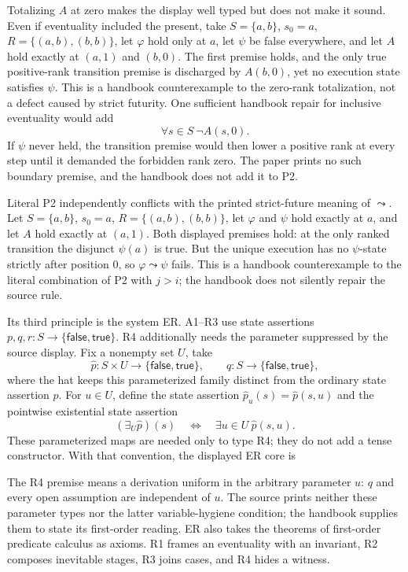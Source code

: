 Totalizing \(A\) at zero makes the display well typed but does not make it
sound.  Even if eventuality included the present, take
\(S=\{a,b\}\), \(s_0=a\), \(R=\{(a,b),(b,b)\}\), let \(\varphi\) hold only at
\(a\), let \(\psi\) be false everywhere, and let \(A\) hold exactly at
\((a,1)\) and \((b,0)\).  The first premise holds, and the only true
positive-rank transition premise is discharged by \(A(b,0)\), yet no execution
state satisfies \(\psi\).  This is a handbook counterexample to the zero-rank
totalization, not a defect caused by strict futurity.  One sufficient handbook
repair for inclusive eventuality would add
\[
 \forall s\in S\ \neg A(s,0).
\]
If \(\psi\) never held, the transition premise would then lower a positive rank
at every step until it demanded the forbidden rank zero.  The paper prints no
such boundary premise, and the handbook does not add it to P2.

Literal P2 independently conflicts with the printed strict-future meaning of
\(\leadsto\).  Let \(S=\{a,b\}\), \(s_0=a\),
\(R=\{(a,b),(b,b)\}\), let \(\varphi\) and \(\psi\) hold exactly at \(a\),
and let \(A\) hold exactly at \((a,1)\).  Both displayed premises hold: at the
only ranked transition the disjunct \(\psi(a)\) is true.  But the unique
execution has no \(\psi\)-state strictly after position \(0\), so
\(\varphi\leadsto\psi\) fails.  This is a handbook counterexample to the
literal combination of P2 with \(j>i\); the handbook does not silently repair
the source rule.

Its third principle is the system ER.  A1--R3 use state assertions
\(p,q,r:S\to\{\mathsf{false},\mathsf{true}\}\).  R4 additionally needs the
parameter suppressed by the source display.  Fix a nonempty set \(U\), take
\[
 \widehat p:S\times U\to\{\mathsf{false},\mathsf{true}\},
 \qquad q:S\to\{\mathsf{false},\mathsf{true}\},
\]
where the hat keeps this parameterized family distinct from the ordinary state
assertion \(p\).  For \(u\in U\), define the state assertion
\(\widehat p_u(s)=\widehat p(s,u)\) and the pointwise existential state assertion
\[
 (\exists_U\widehat p)(s)\quad\Longleftrightarrow\quad
 \exists u\in U\ \widehat p(s,u).
\]
These parameterized maps are needed only to type R4; they do not add a tense
constructor.  With that convention, the displayed ER core is
\par\noindent
\begin{minipage}{\linewidth}
\end{minipage}
\par
The R4 premise means a derivation uniform in the arbitrary parameter \(u\):
\(q\) and every open assumption are independent of \(u\).  The source prints
neither these parameter types nor the latter variable-hygiene condition; the
handbook supplies them to state its first-order reading.  ER also takes the
theorems of first-order predicate calculus as axioms.  R1 frames an eventuality
with an invariant, R2 composes inevitable stages, R3 joins cases, and R4 hides
a witness.

